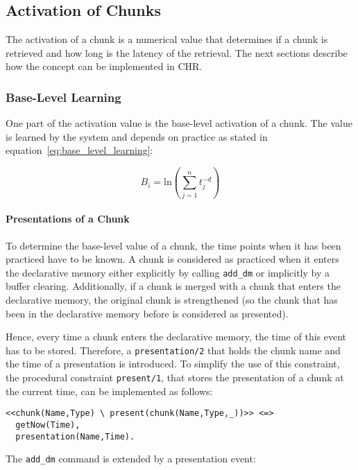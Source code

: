 \subsection{Activation of Chunks}

The activation of a chunk is a numerical value that determines if a chunk is retrieved and how long is the latency of the retrieval. The next sections describe how the concept can be implemented in CHR.

\subsubsection{Base-Level Learning}

One part of the activation value is the base-level activation of a chunk. The value is learned by the system and depends on practice as stated in equation~\eqref{eq:base_level_learning}:

\begin{equation*}
B_i = \mathrm{ln}\left(\sum_{j=1}^n{t_j^{-d}}\right) 
\end{equation*}

\paragraph{Presentations of a Chunk} 

To determine the base-level value of a chunk, the time points when it has been practiced have to be known. A chunk is considered as practiced when it enters the declarative memory either explicitly by calling \lstinline|add_dm| or implicitly by a buffer clearing. Additionally, if a chunk is merged with a chunk that enters the declarative memory, the original chunk is strengthened (so the chunk that has been in the declarative memory before is considered as presented). 

Hence, every time a chunk enters the declarative memory, the time of this event has to be stored. Therefore, a \lstinline|presentation/2| that holds the chunk name and the time of a presentation is introduced. To simplify the use of this constraint, the procedural constraint \lstinline|present/1|, that stores the presentation of a chunk at the current time, can be implemented as follows:

\begin{lstlisting}
<<chunk(Name,Type) \ present(chunk(Name,Type,_))>> <=> 
  getNow(Time),
  presentation(Name,Time).
\end{lstlisting}

The \lstinline|add_dm| command is extended by a presentation event:

